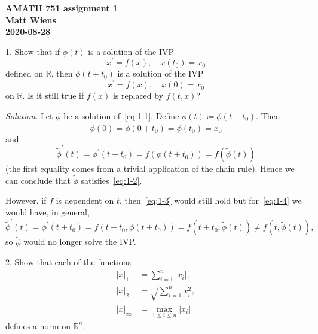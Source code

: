 \documentclass{article}
\newcommand{\R}{\mathbb{R}}
\begin{document}
\textbf{AMATH 751 assignment 1} \\
\textbf{Matt Wiens} \\
\textbf{2020-08-28}

1. Show that if $\phi(t)$ is a solution of the IVP
%
\begin{equation}
    x^\prime = f(x), \quad x(t_0) = x_0
    \label{eq:1-1}
\end{equation}
%
defined on $\R$, then $\phi(t + t_0)$ is a solution of the IVP
%
\begin{equation}
    x^\prime = f(x), \quad x(0) = x_0
    \label{eq:1-2}
\end{equation}
%
on $\R$. Is it still true if $f(x)$ is replaced by $f(t, x)$?

\textit{Solution.}
Let $\phi$ be a solution of~\eqref{eq:1-1}. Define
$\tilde{\phi}(t) \coloneqq \phi(t + t_0)$. Then
%
\begin{equation}
    \tilde{\phi}(0) = \phi(0 + t_0) = \phi(t_0) = x_0
    \label{eq:1-3}
\end{equation}
%
and
%
\begin{equation}
    \tilde{\phi}^\prime(t) = \phi^\prime(t + t_0) = f(\phi(t + t_0)) = f(\tilde{\phi}(t))
    \label{eq:1-4}
\end{equation}
%
(the first equality comes from a trivial application of the chain rule). Hence
we can conclude that $\tilde{\phi}$ satisfies~\eqref{eq:1-2}.

However, if $f$ is dependent on $t$, then~\eqref{eq:1-3} would still hold but
for~\eqref{eq:1-4} we would have, in general,
%
\begin{equation*}
    \tilde{\phi}^\prime(t)
        = \phi^\prime(t + t_0)
        = f(t + t_0, \phi(t + t_0))
        = f(t + t_0, \tilde{\phi}(t))
        \neq f(t, \tilde{\phi}(t))
        ,
\end{equation*}
%
so $\tilde{\phi}$ would no longer solve the IVP.

\newpage

2. Show that each of the functions
%
\begin{align*}
    |x|_1 &= \sum_{i = 1}^n |x_i|, \\
    |x|_2 &= \sqrt{\sum_{i = 1}^n x_i^2}, \\
    |x|_\infty &= \max_{1 \leq i \leq n} |x_i|
\end{align*}
%
defines a norm on $\R^n$.
\end{document}
